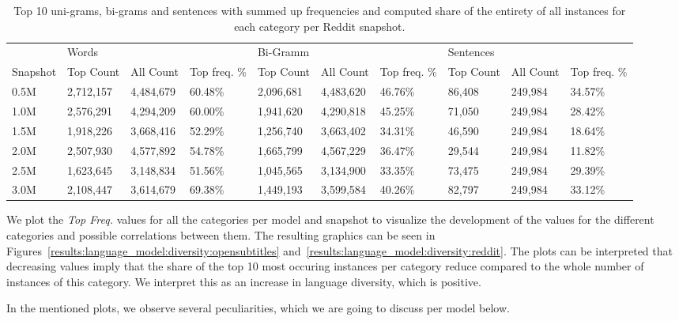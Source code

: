 \begin{table}[H]
	\centering
	\begin{adjustbox}{max width=\textwidth}
		\begin{tabular}{llllllllll}
			\toprule
			& Words &&&Bi-Gramm&&&Sentences&&\\
			Snapshot & Top Count & All Count& Top freq. \%&  Top Count& All Count& Top freq. \%&  Top Count& All Count& Top freq. \%\\
			\midrule
			0.5M & 2,712,157	 & 4,484,679	 & 60.48\%	&2,096,681	&4,483,620	&46.76\%	&86,408	&249,984	&34.57\%\\
			1.0M & 2,576,291	 & 4,294,209	 & 60.00\%	&1,941,620	&4,290,818	&45.25\%	&71,050	&249,984	&28.42\%\\
			1.5M & 1,918,226	 & 3,668,416	 & 52.29\%	&1,256,740	&3,663,402	&34.31\%	&46,590	&249,984	&18.64\%\\
			2.0M & 2,507,930	 & 4,577,892	 & 54.78\%	&1,665,799	&4,567,229	&36.47\%	&29,544	&249,984	&11.82\%\\
			2.5M & 1,623,645	 & 3,148,834	 & 51.56\%	&1,045,565	&3,134,900	&33.35\%	&73,475	&249,984	&29.39\%\\
			3.0M & 2,108,447	 & 3,614,679	 & 69.38\%	&1,449,193	&3,599,584	&40.26\%	&82,797	&249,984	&33.12\%\\
			\bottomrule
		\end{tabular}
	\end{adjustbox}
	\caption{Top 10 uni-grams, bi-grams and sentences with summed up frequencies and computed share of the entirety of all instances for each category per Reddit snapshot.}
	\label{results:top_10_frequency:reddit}
\end{table}

We plot the \emph{Top Freq.} values for all the categories per model and snapshot to visualize the development of the values for the different categories and possible correlations between them. The resulting graphics can be seen in Figures~\ref{results:language_model:diversity:opensubtitles} and~\ref{results:language_model:diversity:reddit}. The plots can be interpreted that decreasing values imply that the share of the top 10 most occuring instances per category reduce compared to the whole number of instances of this category. We interpret this as an increase in language diversity, which is positive.

In the mentioned plots, we observe several peculiarities, which we are going to discuss per model below.

